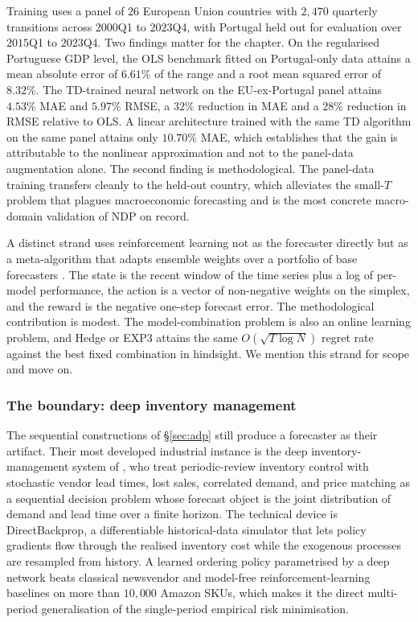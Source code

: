 Training uses a panel of $26$ European Union countries with $2{,}470$
quarterly transitions across $2000$Q1 to $2023$Q4, with Portugal held out
for evaluation over $2015$Q1 to $2023$Q4. Two findings matter for the
chapter. On the regularised Portuguese GDP level, the OLS benchmark
fitted on Portugal-only data attains a mean absolute error of $6.61\%$ of
the range and a root mean squared error of $8.32\%$. The TD-trained
neural network on the EU-ex-Portugal panel attains $4.53\%$ MAE and
$5.97\%$ RMSE, a $32\%$ reduction in MAE and a $28\%$ reduction in RMSE
relative to OLS. A linear architecture trained with the same TD algorithm
on the same panel attains only $10.70\%$ MAE, which establishes that the
gain is attributable to the nonlinear approximation and not to the
panel-data augmentation alone. The second finding is methodological. The
panel-data training transfers cleanly to the held-out country, which
alleviates the small-$T$ problem that plagues macroeconomic forecasting
and is the most concrete macro-domain validation of NDP on record.

A distinct strand uses reinforcement learning not as the forecaster
directly but as a meta-algorithm that adapts ensemble weights over a
portfolio of base forecasters \citep{Fu2022}. The state is the recent
window of the time series plus a log of per-model performance, the
action is a vector of non-negative weights on the simplex, and the
reward is the negative one-step forecast error. The methodological
contribution is modest. The model-combination problem is also an online
learning problem, and Hedge or EXP3 attains the same $O(\sqrt{T \log N})$
regret rate against the best fixed combination in hindsight. We mention
this strand for scope and move on.

\subsubsection{The boundary: deep inventory management}
\label{sec:madeka}

The sequential constructions of \S\ref{sec:adp} still produce a
forecaster as their artifact. Their most developed industrial instance is
the deep inventory-management system of \citet{Madeka2022DeepInventory},
who treat periodic-review inventory control with stochastic vendor lead
times, lost sales, correlated demand, and price matching as a sequential
decision problem whose forecast object is the joint distribution of
demand and lead time over a finite horizon. The technical device is
DirectBackprop, a differentiable historical-data simulator that lets
policy gradients flow through the realised inventory cost while the
exogenous processes are resampled from history. A learned ordering policy
parametrised by a deep network beats classical newsvendor and model-free
reinforcement-learning baselines on more than $10{,}000$ Amazon SKUs,
which makes it the direct multi-period generalisation of the
\citet{BanRudin2019} single-period empirical risk minimisation.

